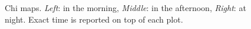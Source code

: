 \documentclass[article]{jss}
\begin{document}
\begin{figure}[!h]
  \centering
  \caption{Chi maps. \emph{Left}: in the morning, \emph{Middle}: in the afternoon, \emph{Right}: at night.  Exact time is reported on top of each plot.}
  \label{bijingchi}
  \end{figure}
\end{document}

